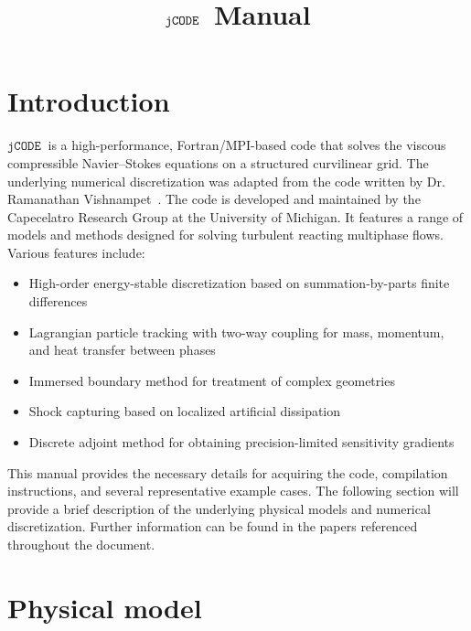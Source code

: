 \documentclass[12pt]{article}
\title{$\jcode$ Manual}
\author{}
\newcommand{\code}[1]{\texttt{#1}}
\newcommand{\jcode}{\code{jCODE}~}
\begin{document}
\maketitle

\tableofcontents

\section{Introduction}
$\jcode$ is a high-performance, Fortran/MPI-based code that solves the viscous compressible Navier--Stokes equations on a structured curvilinear grid. The underlying numerical discretization was adapted from the code written by Dr. Ramanathan Vishnampet~\cite{vishnampet2015exact}. The code is developed and maintained by the Capecelatro Research Group at the University of Michigan. It features a range of models and methods designed for solving turbulent reacting multiphase flows. Various features include:
\begin{itemize}
\item High-order energy-stable discretization based on summation-by-parts finite differences
\item Lagrangian particle tracking with two-way coupling for mass, momentum, and heat transfer between phases
\item Immersed boundary method for treatment of complex geometries
\item Shock capturing based on localized artificial dissipation
\item Discrete adjoint method for obtaining precision-limited sensitivity gradients
\end{itemize}

This manual provides the necessary details for acquiring the code, compilation instructions, and several representative example cases. The following section will provide a brief description of the underlying physical models and numerical discretization. Further information can be found in the papers referenced throughout the document.

\section{Physical model}
\end{document}
